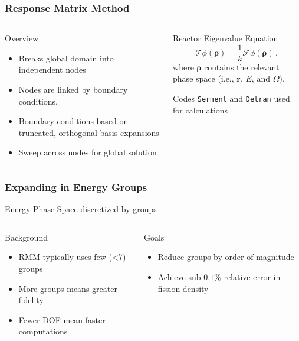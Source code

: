 \documentclass[fleqn]{beamer}
\begin{document}
  \begin{frame}
    \frametitle{Response Matrix Method}
    \begin{columns}[c]
      \begin{column}{0.5\textwidth}
	\begin{block}{Overview}
	  \begin{itemize}
	    \item Breaks global domain into independent nodes
	    \item Nodes are linked by boundary conditions.
	    \item Boundary conditions based on truncated, orthogonal basis expansions
	    \item Sweep across nodes for global solution
	  \end{itemize}
	\end{block}
      \end{column}
      \begin{column}{0.5\textwidth}
	Reactor Eigenvalue Equation
	\begin{equation}
	  \mathcal{T} \phi(\bm{\rho}) = \frac{1}{k} \mathcal{F} \phi(\bm{\rho}) \, , \nonumber
	\end{equation}
	where $\bm{\rho}$ contains the relevant phase space (i.e., $\mathbf{r}$, $E$, and $\Omega$).
	\vspace{\baselineskip}

	Codes {\tt Serment} and {\tt Detran} used for calculations
      \end{column}
    \end{columns}
  \end{frame}

  \begin{frame}
    \frametitle{Expanding in Energy Groups}
    Energy Phase Space discretized by groups
    \begin{columns}[T]
      \begin{column}{0.5\textwidth}
	\begin{block}{Background}
	  \begin{itemize}
	    \item RMM typically uses few (<7) groups
	    \item More groups means greater fidelity
	    \item Fewer DOF mean faster computations
	  \end{itemize}
	\end{block}
      \end{column}
      \begin{column}{0.5\textwidth}
	\begin{block}{Goals}
	  \begin{itemize}
	    \item Reduce groups by order of magnitude
	    \item Achieve sub $0.1\%$ relative error in fission density
	  \end{itemize}
	\end{block}
      \end{column}
    \end{columns}
  \end{frame}
\end{document}
